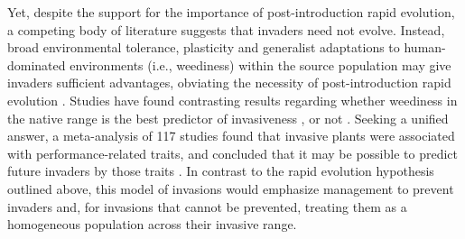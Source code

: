 \documentclass[12pt]{article}\usepackage[]{graphicx}\usepackage[]{color}
\begin{document}
	Yet, despite the support for the importance of post-introduction rapid evolution, a competing body of literature suggests that invaders need not evolve. Instead, broad environmental tolerance, plasticity and generalist adaptations to human-dominated environments (i.e., weediness) within the source population may give invaders sufficient advantages, obviating the necessity of post-introduction rapid evolution \parencite{Richards2006,Schwartz1994,Bock2015,Rejmanek1996,Baker1965}. %
	Studies have found contrasting results regarding whether weediness in the native range is the best predictor of invasiveness %
	\parencite[e.g.,][]{Maillet2000}, or not \parencite{Perrins1992,Mack1996}. Seeking a unified answer, a meta-analysis of 117 studies found that invasive plants were associated with performance-related traits, and concluded that it may be possible to predict future invaders by those traits \parencite{VanKleunen2010}. In contrast to the rapid evolution hypothesis outlined above, this model of invasions would emphasize management to prevent invaders and, for invasions that cannot be prevented, treating them as a homogeneous population across their invasive range.
	
\end{document}
